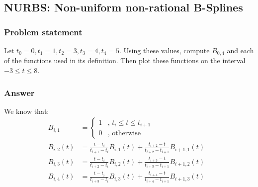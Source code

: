 \documentclass[a4paper,10pt]{article}
\begin{document}
\pagebreak

\subsection{NURBS: Non-uniform non-rational B-Splines}
\bigskip

\subsubsection{Problem statement}
\bigskip

Let $t_0=0, t_1=1, t_2=3, t_3=4, t_4=5$. Using these values, compute $B_{0,4}$ and each of the functions used in its definition. Then plot these functions on the interval $-3 \leq t \leq 8$.

\subsubsection{Answer}
\bigskip

We know that:
\begin{equation}
\left.\begin{aligned}
B_{i, 1} &=
\begin{cases}
   1 & \text{, } t_i \leq t \leq t_{i+1} \\
   0 & \text{, otherwise}
  \end{cases}& \\
B_{i,2}(t) &= \frac{t-t_i}{t_{i+1}-t_i}B_{i,1}(t) + \frac{t_{i+2}-t}{t_{i+2}-t_{i+1}}B_{i+1,1}(t)& \\
B_{i,3}(t) &= \frac{t-t_i}{t_{i+2}-t_i}B_{i,2}(t) + \frac{t_{i+3}-t}{t_{i+3}-t_{i+1}}B_{i+1,2}(t)& \\
B_{i,4}(t) &= \frac{t-t_i}{t_{i+3}-t_i}B_{i,3}(t) + \frac{t_{i+4}-t}{t_{i+4}-t_{i+1}}B_{i+1,3}(t)&\\\\
\end{aligned}\right.
\end{equation}
\end{document}
